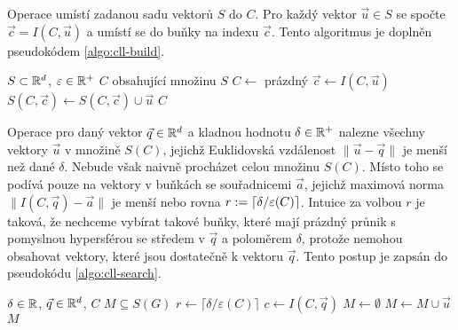 Operace  umístí zadanou sadu vektorů $S$ do  $C$. Pro každý vektor $\vec{u} \in S$ se spočte $\vec{c} = I(C, \vec{u})$ a umístí se do buňky na indexu $\vec{c}$. Tento algoritmus je doplněn pseudokódem \ref{algo:cll-build}.

\begin{algorithm}[ht!]
  \caption{}
  \label{algo:cll-build}
  \begin{algorithmic}
    \Require $S \subset \mathbb{R}^d$, $\varepsilon \in \mathbb{R}^+$
    \Ensure {} $C$ obsahující množinu $S$
    \State $C \leftarrow$ prázdný 
      \State $\vec{c} \leftarrow I(C, \vec{u})$
      \State $S(C, \vec{c}) \leftarrow S(C, \vec{c}) \cup \vec{u}$
    \EndFor
    \State \Return $C$
  \end{algorithmic}
\end{algorithm}

Operace  pro daný vektor $\vec{q} \in \mathbb{R}^d$ a kladnou hodnotu $\delta \in \mathbb{R}^+$ nalezne všechny vektory $\vec{u}$ v množině $S(C)$, jejichž Euklidovská vzdálenost $\|\vec{u} - \vec{q}\|$ je menší než dané $\delta$. Nebude však naivně procházet celou množinu $S(C)$. Místo toho se podívá pouze na vektory v buňkách se souřadnicemi $\vec{a}$, jejichž maximová norma $\|I(C, \vec{q}) - \vec{a}\|$ je menší nebo rovna $r := \lceil\delta / \varepsilon(C)\rceil$. Intuice za volbou $r$ je taková, že nechceme vybírat takové buňky, které mají prázdný průnik s pomyslnou hypersférou se středem v $\vec{q}$ a poloměrem $\delta$, protože nemohou obsahovat vektory, které jsou dostatečně  k vektoru $\vec{q}$. Tento postup je zapsán do pseudokódu \ref{algo:cll-search}.

\begin{algorithm}[ht!]
  \caption{}
  \label{algo:cll-search}
  \begin{algorithmic}
    \Require $\delta \in \mathbb{R}$, $\vec{q} \in \mathbb{R}^d$,  $C$
    \Ensure $M \subseteq S(G)$
    \State $r \leftarrow \lceil\delta / \varepsilon(C)\rceil$
    \State $c \leftarrow I(C, \vec{q})$
    \State $M \leftarrow \emptyset$
        \State $M \leftarrow M \cup \vec{u}$
      \EndFor
    \EndFor
    \State \Return $M$
  \end{algorithmic}
\end{algorithm}

